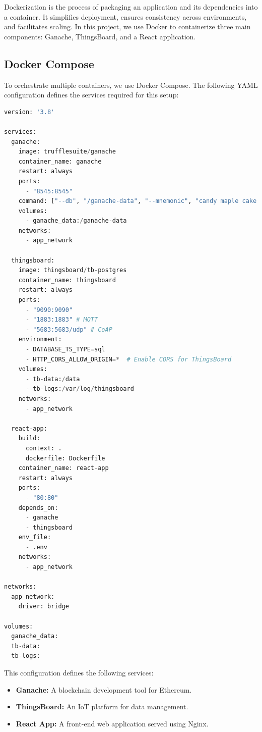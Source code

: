 \documentclass[a4paper,12pt]{report}
\begin{document}
Dockerization is the process of packaging an application and its dependencies into a container. It simplifies deployment, ensures consistency across environments, and facilitates scaling. In this project, we use Docker to containerize three main components: Ganache, ThingsBoard, and a React application.

\subsection{Docker Compose}

To orchestrate multiple containers, we use Docker Compose. The following YAML configuration defines the services required for this setup:

\begin{lstlisting}[language=python]
version: '3.8'

services:
  ganache:
    image: trufflesuite/ganache
    container_name: ganache
    restart: always
    ports:
      - "8545:8545"
    command: ["--db", "/ganache-data", "--mnemonic", "candy maple cake sugar pudding cream honey rich smooth crumble sweet treat"]
    volumes:
      - ganache_data:/ganache-data
    networks:
      - app_network

  thingsboard:
    image: thingsboard/tb-postgres
    container_name: thingsboard
    restart: always
    ports:
      - "9090:9090"
      - "1883:1883" # MQTT
      - "5683:5683/udp" # CoAP
    environment:
      - DATABASE_TS_TYPE=sql
      - HTTP_CORS_ALLOW_ORIGIN=*  # Enable CORS for ThingsBoard
    volumes:
      - tb-data:/data
      - tb-logs:/var/log/thingsboard
    networks:
      - app_network

  react-app:
    build:
      context: .
      dockerfile: Dockerfile
    container_name: react-app
    restart: always
    ports:
      - "80:80"
    depends_on:
      - ganache
      - thingsboard
    env_file:
      - .env
    networks:
      - app_network

networks:
  app_network:
    driver: bridge

volumes:
  ganache_data:
  tb-data:
  tb-logs:
\end{lstlisting}

\noindent
This configuration defines the following services:
\begin{itemize}
    \item \textbf{Ganache:} A blockchain development tool for Ethereum.
    \item \textbf{ThingsBoard:} An IoT platform for data management.
    \item \textbf{React App:} A front-end web application served using Nginx.
\end{itemize}
\end{document}
